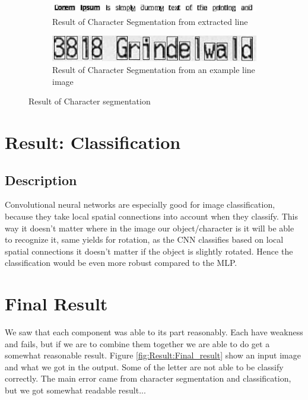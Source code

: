 \documentclass[Report.tex]{subfiles}
\begin{document}
\begin{figure}[H]
  \begin{subfigure}[t]{\textwidth}
    \centering
    \includegraphics[height=0.45cm]{res/segment_letter1.png}
    \caption{Result of Character Segmentation from extracted line}
  \end{subfigure}
  \begin{subfigure}[t]{\textwidth}
    \centering
    \includegraphics[width=12cm]{res/segment_letter2.png}
    \caption{Result of Character Segmentation from an example line image}
  \end{subfigure}
  \caption{Result of Character segmentation}
  \label{fig:Character_segmentation}
\end{figure}

\section{Result: Classification}

\subsection{Description}
\begin{flushleft}
  Convolutional neural networks are especially good for image
  classification, because they take local spatial connections into account when
  they classify. This way it doesn't matter where in the image our
  object/character is it will be able to recognize it, same yields for rotation,
  as the CNN classifies based on local spatial connections it doesn't matter if
  the object is slightly rotated. Hence the classification would be even more robust
  compared to the MLP.
\end{flushleft}

\section{Final Result}
We saw that each component was able to its part reasonably. Each have weakness and fails, but if we are to combine them together we are able to do get a somewhat reasonable result. Figure \ref{fig:Result:Final_result} show an input image and what we got in the output. Some of the letter are not able to be classify correctly. The main error came from character segmentation and classification, but we got somewhat readable result... 
\end{document}

